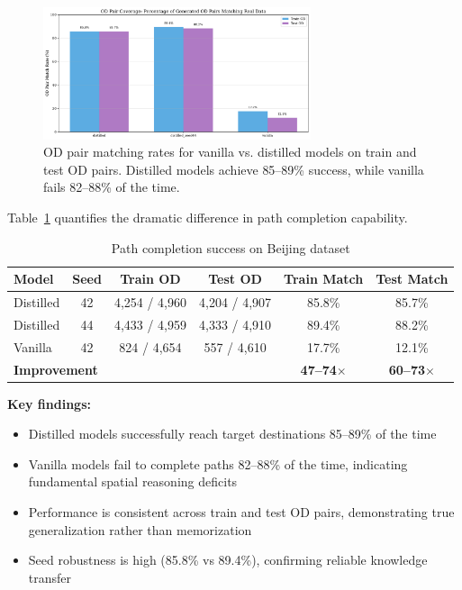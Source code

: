 \begin{figure}[h]
\centering
\includegraphics[width=0.7\textwidth]{assets/plots/hoser/od_matching_rates.pdf}
\caption{OD pair matching rates for vanilla vs. distilled models on train and test OD pairs. Distilled models achieve 85--89\% success, while vanilla fails 82--88\% of the time.}
\label{fig:od-matching}
\end{figure}

Table~\ref{tab:od-results} quantifies the dramatic difference in path completion capability.

\begin{table}[h]
\centering
\caption{Path completion success on Beijing dataset}
\label{tab:od-results}
\small
\begin{tabular}{lccccc}
\toprule
\textbf{Model} & \textbf{Seed} & \textbf{Train OD} & \textbf{Test OD} & \textbf{Train Match} & \textbf{Test Match} \\
\midrule
Distilled & 42 & 4,254 / 4,960 & 4,204 / 4,907 & 85.8\% & 85.7\% \\
Distilled & 44 & 4,433 / 4,959 & 4,333 / 4,910 & 89.4\% & 88.2\% \\
Vanilla & 42 & 824 / 4,654 & 557 / 4,610 & 17.7\% & 12.1\% \\
\midrule
\multicolumn{4}{l}{\textbf{Improvement}} & \textbf{47--74$\times$} & \textbf{60--73$\times$} \\
\bottomrule
\end{tabular}
\end{table}

\textbf{Key findings:}
\begin{itemize}[noitemsep,topsep=0pt]
\item Distilled models successfully reach target destinations 85--89\% of the time
\item Vanilla models fail to complete paths 82--88\% of the time, indicating fundamental spatial reasoning deficits
\item Performance is consistent across train and test OD pairs, demonstrating true generalization rather than memorization
\item Seed robustness is high (85.8\% vs 89.4\%), confirming reliable knowledge transfer
\end{itemize}

